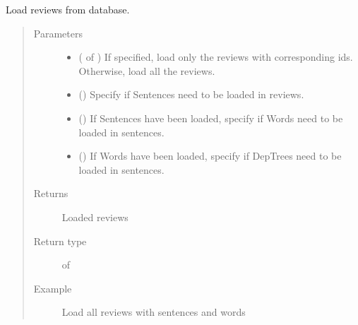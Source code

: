 \documentclass[letterpaper,10pt,english]{sphinxmanual}
\begin{document}
\begin{fulllineitems}
\label{\detokenize{load:loacore.load.review_load.load_reviews}}
Load reviews from database.
\begin{quote}\begin{description}
\item[{Parameters}] \leavevmode\begin{itemize}
\item {} 
 ( of ) \textendash{} If specified, load only the reviews with corresponding ids. Otherwise, load all the reviews.

\item {} 
 () \textendash{} Specify if Sentences need to be loaded in reviews.

\item {} 
 () \textendash{} If Sentences have been loaded, specify if Words need to be loaded in sentences.

\item {} 
 () \textendash{} If Words have been loaded, specify if DepTrees need to be loaded in sentences.

\end{itemize}

\item[{Returns}] \leavevmode
Loaded reviews

\item[{Return type}] \leavevmode
{} of {\hyperref[\detokenize{classes:loacore.classes.classes.Review}]{}}

\item[{Example}] \leavevmode
Load all reviews with sentences and words


\end{description}
\end{quote}
\end{fulllineitems}
\end{document}
